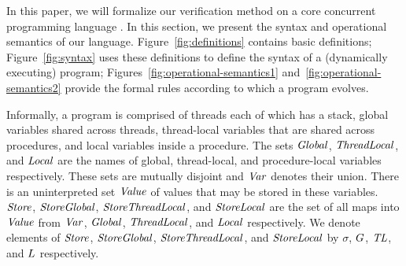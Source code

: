 In this paper, we will formalize our verification method on a core concurrent programming language \civl.
In this section, we present the syntax and operational semantics of our language.
Figure~\ref{fig:definitions} contains basic definitions; 
Figure~\ref{fig:syntax} uses these definitions to define the syntax of a (dynamically executing) \civl program;
Figures~\ref{fig:operational-semantics1} and~\ref{fig:operational-semantics2} provide the formal rules according 
to which a \civl program evolves.

Informally, a \civl program is comprised of threads each of which has a stack, global variables shared across threads, 
thread-local variables that are shared across procedures, and local variables inside a procedure.
The sets $\mathit{Global}$, $\mathit{ThreadLocal}$, and $\mathit{Local}$ are the names of global, thread-local, and procedure-local variables 
respectively.
These sets are mutually disjoint and $\mathit{Var}$ denotes their union.
There is an uninterpreted set $\mathit{Value}$ of values that may be stored in these variables.
$\mathit{Store}$, $\mathit{StoreGlobal}$, $\mathit{StoreThreadLocal}$, and $\mathit{StoreLocal}$ are the set of all maps into $\mathit{Value}$
from $\mathit{Var}$, $\mathit{Global}$, $\mathit{ThreadLocal}$, and $\mathit{Local}$ respectively.
We denote elements of $\mathit{Store}$, $\mathit{StoreGlobal}$, $\mathit{StoreThreadLocal}$, and $\mathit{StoreLocal}$
by $\sigma$, $G$, $\mathit{TL}$, and $L$ respectively.

